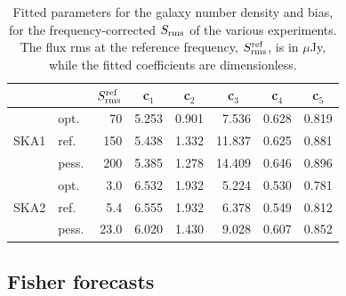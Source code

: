 \documentclass[useAMS,usenatbib]{mn2e}
\begin{document}
\begin{table}
\hspace{-1.5em}
{\renewcommand{\arraystretch}{1.3}
\begin{tabular}{llrrrrrr}
\hline 
 & & $S_{\rm rms}^{\rm ref}$ & \multicolumn{1}{c}{c$_1$} & \multicolumn{1}{c}{c$_2$} & \multicolumn{1}{c}{c$_3$} & \multicolumn{1}{c}{c$_4$} & \multicolumn{1}{c}{c$_5$} \\ 
\hline
\multirow{3}{*}{SKA1} & opt. & 70  & 5.253 & 0.901 & 7.536 & 0.628 & 0.819 \\
 & ref. & 150 &5.438 & 1.332 & 11.837 & 0.625 & 0.881 \\
 & pess. & 200 &5.385 & 1.278 & 14.409 & 0.646 & 0.896 \\
\hline
\multirow{3}{*}{SKA2} & opt. & 3.0 &6.532 & 1.932 & 5.224 & 0.530 & 0.781 \\
 & ref. & 5.4&6.555 & 1.932 & 6.378 & 0.549 & 0.812\\
 & pess. & 23.0& 6.020 & 1.430 & 9.028 & 0.607 & 0.852\\
\hline
\end{tabular} }
\caption{Fitted parameters for the galaxy number density and bias, for the frequency-corrected $S_{\rm rms}$ of the various experiments. The flux rms at the reference frequency, $S^{\rm ref}_{\rm rms}$, is in $\mu$Jy, while the fitted coefficients are dimensionless.}
\label{tab:corrected_nz}
\end{table}%


\subsection{Fisher forecasts} \label{sec:fisher}
\end{document}
